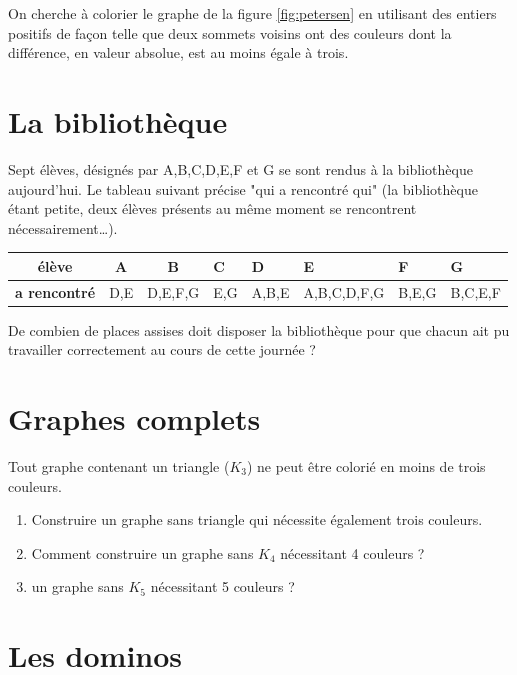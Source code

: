 \documentclass{article}[12pt]
\begin{document}
On cherche à colorier le graphe de la figure \ref{fig:petersen} en utilisant des entiers positifs de façon telle que deux sommets voisins ont des couleurs dont la différence, en valeur absolue, est au moins égale à trois.


\section*{La bibliothèque}

Sept élèves, désignés par A,B,C,D,E,F et G se sont rendus à la bibliothèque aujourd'hui. Le tableau suivant précise "qui a rencontré qui" (la bibliothèque étant petite, deux élèves présents au même moment se rencontrent nécessairement…). 

\begin{table}[h!]
\begin{tabular}{|c|c|c|l|l|l|l|l|}
\hline
\textbf{élève}       & \textbf{A} & \textbf{B} & \textbf{C} & \textbf{D} & \textbf{E}  & \textbf{F} & \textbf{G} \\ \hline
\textbf{a rencontré} & D,E        & D,E,F,G    & E,G        & A,B,E      & A,B,C,D,F,G & B,E,G      & B,C,E,F    \\ \hline
\end{tabular}
\end{table}

De combien de places assises doit disposer la bibliothèque pour que chacun ait pu travailler correctement au cours de cette journée ?

\section*{Graphes complets}

Tout graphe contenant un triangle ($K_3$) ne peut être colorié en moins de trois couleurs.

\begin{enumerate}
    \item Construire un graphe sans triangle qui nécessite également trois couleurs.
    \item Comment construire un graphe sans $K_4$ nécessitant 4 couleurs ?
    \item un graphe sans $K_5$ nécessitant 5 couleurs ?
\end{enumerate}

\section*{Les dominos}
\end{document}
